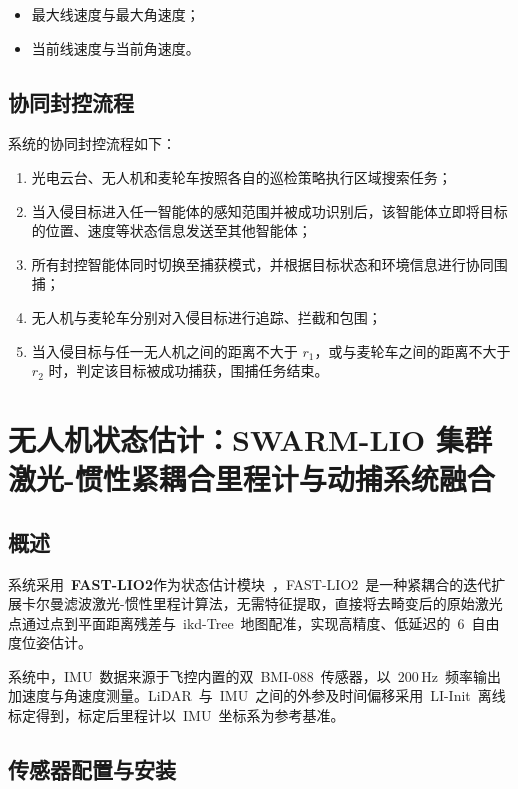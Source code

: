 \begin{itemize}
    \item 最大线速度与最大角速度；
    \item 当前线速度与当前角速度。
\end{itemize}


\subsection{协同封控流程}

系统的协同封控流程如下：

\begin{enumerate}
    \item 光电云台、无人机和麦轮车按照各自的巡检策略执行区域搜索任务；
    \item 当入侵目标进入任一智能体的感知范围并被成功识别后，该智能体立即将目标的位置、速度等状态信息发送至其他智能体；
    \item 所有封控智能体同时切换至捕获模式，并根据目标状态和环境信息进行协同围捕；
    \item 无人机与麦轮车分别对入侵目标进行追踪、拦截和包围；
    \item 当入侵目标与任一无人机之间的距离不大于 $r_1$，或与麦轮车之间的距离不大于 $r_2$ 时，判定该目标被成功捕获，围捕任务结束。
\end{enumerate}
\section{无人机状态估计：SWARM-LIO 集群激光-惯性紧耦合里程计与动捕系统融合}

\subsection{概述}

系统采用~\textbf{FAST-LIO2}作为状态估计模块~\cite{xu2022fastlio2}，FAST-LIO2~是一种紧耦合的迭代扩展卡尔曼滤波激光-惯性里程计算法，无需特征提取，直接将去畸变后的原始激光点通过点到平面距离残差与~ikd-Tree~地图配准，实现高精度、低延迟的~6~自由度位姿估计。

系统中，IMU~数据来源于飞控内置的双~BMI-088~传感器，以~$200\,\text{Hz}$~频率输出加速度与角速度测量。LiDAR~与~IMU~之间的外参及时间偏移采用~LI-Init~\cite{zhu2022liinit}离线标定得到，标定后里程计以~IMU~坐标系为参考基准。

\subsection{传感器配置与安装}

